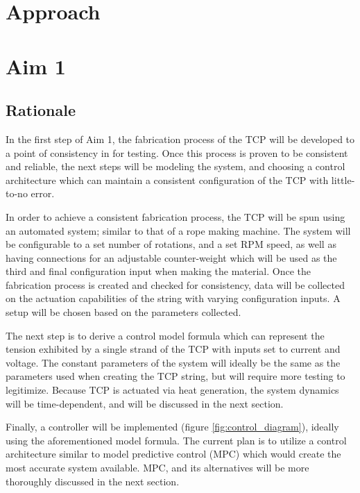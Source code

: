 \section*{Approach}

\section{Aim 1}

\subsection{Rationale}

In the first step of Aim 1, the fabrication process of the TCP will be developed to a point of consistency in for testing. Once this process is proven to be consistent and reliable, the next steps will be modeling the system, and choosing a control architecture which can maintain a consistent configuration of the TCP with little-to-no error.

In order to achieve a consistent fabrication process, the TCP will be spun using an automated system; similar to that of a rope making machine. The system will be configurable to a set number of rotations, and a set RPM speed, as well as having connections for an adjustable counter-weight which will be used as the third and final configuration input when making the material. Once the fabrication process is created and checked for consistency, data will be collected on the actuation capabilities of the string with varying configuration inputs. A setup will be chosen based on the parameters collected.

The next step is to derive a control model formula which can represent the tension exhibited by a single strand of the TCP with inputs set to current and voltage. The constant parameters of the system will ideally be the same as the parameters used when creating the TCP string, but will require more testing to legitimize. Because TCP is actuated via heat generation, the system dynamics will be time-dependent, and will be discussed in the next section.

Finally, a controller will be implemented (figure \ref{fig:control_diagram}), ideally using the aforementioned model formula. The current plan is to utilize a control architecture similar to model predictive control (MPC) which would create the most accurate system available. MPC, and its alternatives will be more thoroughly discussed in the next section.

